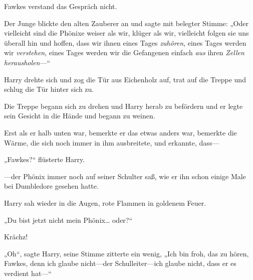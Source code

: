 Fawkes verstand das Gespräch nicht.

Der Junge blickte den alten Zauberer an und sagte mit belegter Stimme: „Oder vielleicht sind die Phönixe weiser als wir, klüger als wir, vielleicht folgen sie uns überall hin und hoffen, dass wir ihnen eines Tages \emph{zuhören}, eines Tages werden wir \emph{verstehen}, eines Tages werden wir die Gefangenen einfach \emph{aus} ihren \emph{Zellen} \emph{herausholen}—“

Harry drehte sich und zog die Tür aus Eichenholz auf, trat auf die Treppe und schlug die Tür hinter sich zu.

Die Treppe begann sich zu drehen und Harry herab zu befördern und er legte sein Gesicht in die Hände und begann zu weinen.

Erst als er halb unten war, bemerkte er das etwas anders war, bemerkte die Wärme, die sich noch immer in ihm ausbreitete, und erkannte, dass—

„Fawkes?“ flüsterte Harry.

—der Phönix immer noch auf seiner Schulter saß, wie er ihn schon einige Male bei Dumbledore gesehen hatte.

Harry sah wieder in die Augen, rote Flammen in goldenem Feuer.

„Du bist jetzt nicht mein Phönix… oder?“

Krächz!

„Oh“, sagte Harry, seine Stimme zitterte ein wenig, „Ich bin froh, das zu hören, Fawkes, denn ich glaube nicht—der Schulleiter—ich glaube nicht, dass er es verdient hat—“

